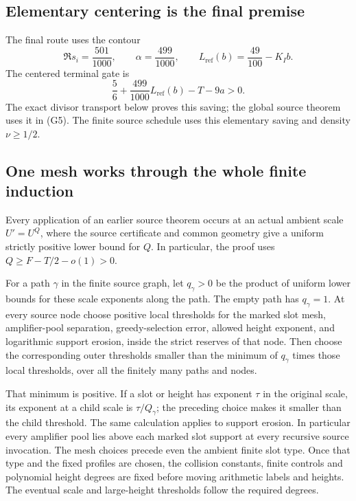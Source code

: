 \hypertarget{sources:elementary-centering-is-the-final-premise}{%
\subsection{Elementary centering is the final premise}\label{sources:elementary-centering-is-the-final-premise}}

The final route uses the contour \[
 \Re s_i=\frac{501}{1000},\qquad
 \alpha=\frac{499}{1000},\qquad
 L_{\mathrm{ref}}(b)=\frac{49}{100}-K_I b.
\] The centered terminal gate is \[
 \frac56+\frac{499}{1000}L_{\mathrm{ref}}(b)-T-9a>0.
\] The exact divisor transport below proves this saving; the global source theorem uses it in (G5). The finite source schedule uses this elementary saving and density \(\nu\ge1/2\).

\hypertarget{sources:one-mesh-works-through-the-whole-finite-induction}{%
\subsection{One mesh works through the whole finite induction}\label{sources:one-mesh-works-through-the-whole-finite-induction}}

Every application of an earlier source theorem occurs at an actual ambient scale \(U'=U^Q\), where the source certificate and common geometry give a uniform strictly positive lower bound for \(Q\). In particular, the proof uses \(Q\ge F-T/2-o(1)>0\).

For a path \(\gamma\) in the finite source graph, let \(q_\gamma>0\) be the product of uniform lower bounds for these scale exponents along the path. The empty path has \(q_\gamma=1\). At every source node choose positive local thresholds for the marked slot mesh, amplifier-pool separation, greedy-selection error, allowed height exponent, and logarithmic support erosion, inside the strict reserves of that node. Then choose the corresponding outer thresholds smaller than the minimum of \(q_\gamma\) times those local thresholds, over all the finitely many paths and nodes.

That minimum is positive. If a slot or height has exponent \(\tau\) in the original scale, its exponent at a child scale is \(\tau/Q_\gamma\); the preceding choice makes it smaller than the child threshold. The same calculation applies to support erosion. In particular every amplifier pool lies above each marked slot support at every recursive source invocation. The mesh choices precede even the ambient finite slot type. Once that type and the fixed profiles are chosen, the collision constants, finite controls and polynomial height degrees are fixed before moving arithmetic labels and heights. The eventual scale and large-height thresholds follow the required degrees.

